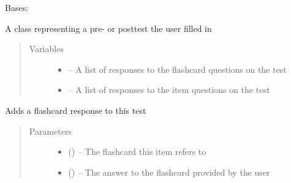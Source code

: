 \documentclass[letterpaper,10pt,english]{sphinxmanual}
\begin{document}
\begin{fulllineitems}
\label{\detokenize{test:test.Test}}
Bases: 

A class representing a pre- or posttest the user filled in
\begin{quote}\begin{description}
\item[{Variables}] \leavevmode\begin{itemize}
\item {} 
 -- A list of responses to the flashcard questions on the test

\item {} 
 -- A list of responses to the item questions on the test

\end{itemize}

\end{description}\end{quote}

\begin{fulllineitems}
\label{\detokenize{test:test.Test.append_flashcard}}
Adds a flashcard response to this test
\begin{quote}\begin{description}
\item[{Parameters}] \leavevmode\begin{itemize}
\item {} 
 ({\hyperref[\detokenize{flashcard:flashcard.Flashcard}]{}}) -- The flashcard this item refers to

\item {} 
 (\href{https://docs.python.org/2/library/string.html\#module-string}{}) -- The answer to the flashcard provided by the user

\end{itemize}

\end{description}\end{quote}


\end{fulllineitems}
\end{fulllineitems}
\end{document}
